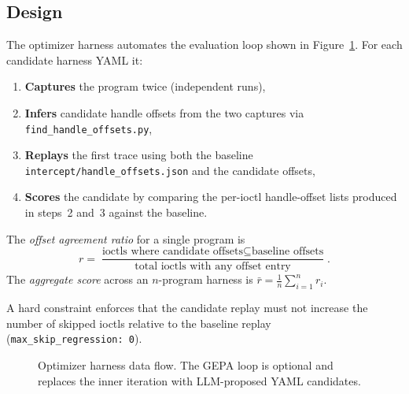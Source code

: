 \documentclass[11pt,a4paper]{article}
\begin{document}
\subsection{Design}

The optimizer harness automates the evaluation loop shown in
Figure~\ref{fig:optimizer}.
For each candidate harness YAML it:
\begin{enumerate}[leftmargin=*]
  \item \textbf{Captures} the program twice (independent runs),
  \item \textbf{Infers} candidate handle offsets from the two captures via
        \texttt{find\_handle\_offsets.py},
  \item \textbf{Replays} the first trace using both the baseline
        \texttt{intercept/handle\_offsets.json} and the candidate offsets,
  \item \textbf{Scores} the candidate by comparing the per-ioctl handle-offset
        lists produced in steps~2 and~3 against the baseline.
\end{enumerate}

The \emph{offset agreement ratio} for a single program is
\[
  r = \frac{\text{ioctls where candidate offsets} \subseteq \text{baseline offsets}}
           {\text{total ioctls with any offset entry}}.
\]
The \emph{aggregate score} across an $n$-program harness is
$\bar{r} = \frac{1}{n}\sum_{i=1}^{n} r_i$.

A hard constraint enforces that the candidate replay must not increase the
number of skipped ioctls relative to the baseline replay (\texttt{max\_skip\_regression:~0}).

\begin{figure}[H]
\centering
{}
\caption{Optimizer harness data flow.  The GEPA loop is optional and replaces
         the inner iteration with LLM-proposed YAML candidates.}
\label{fig:optimizer}
\end{figure}
\end{document}
